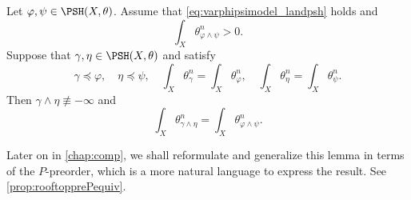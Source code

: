 \begin{lemma}\label{lma:landcorrectmass}
    Let $\varphi,\psi\in \PSH(X,\theta)$. Assume that \eqref{eq:varphipsimodel_landpsh} holds and
    \[
    \int_X \theta_{\varphi\land \psi}^n>0.
    \]
    Suppose that $\gamma,\eta\in \PSH(X,\theta)$ and satisfy
    \[
    \gamma\preceq \varphi,\quad \eta\preceq \psi,\quad \int_X \theta_{\gamma}^n=\int_X \theta_{\varphi}^n,\quad \int_X \theta_{\eta}^n=\int_X \theta_{\psi}^n.
    \]
    Then $\gamma\land \eta\not\equiv -\infty$ and
    \begin{equation}\label{eq:thetagammaeta_temp1}
    \int_X \theta_{\gamma\land \eta}^n=\int_X \theta_{\varphi\land \psi}^n.
    \end{equation}
\end{lemma}
Later on in \cref{chap:comp}, we shall reformulate and generalize this lemma in terms of the $P$-preorder, which is a more natural language to express the result. See \cref{prop:rooftopprePequiv}.
